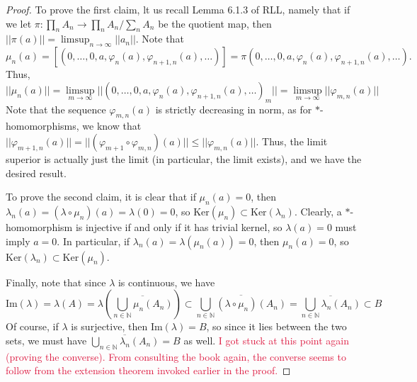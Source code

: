 \documentclass[aps,pra,showpacs,notitlepage,onecolumn,superscriptaddress,nofootinbib]{revtex4-1}
\newcommand{\pop}[1]{\textcolor{crimson}{#1}}
\theoremstyle{definition}
\begin{document}
\begin{proof}
  To prove the first claim, lt us recall Lemma 6.1.3 of RLL, namely that if we let $\pi : \prod_{n} A_n \rightarrow \prod_{n} A_n \Big/ \sum_{n} A_n$ be the quotient map, then $||\pi(a)|| = \limsup_{n \to \infty} ||a_n||$.
  Note that
  $$\mu_n(a) = [(0, \dots, 0, a, \varphi_n(a), \varphi_{n + 1, n}(a), \dots)] = \pi(0, \dots, 0, a, \varphi_n(a), \varphi_{n + 1, n}(a), \dots).$$
  Thus,
  \begin{equation}
    ||\mu_n(a)|| = \limsup_{m \to \infty} || (0, \dots, 0, a, \varphi_n(a), \varphi_{n + 1, n}(a), \dots)_m || = \limsup_{m \to \infty} ||\varphi_{m, n}(a)||
  \end{equation}
  Note that the sequence $\varphi_{m, n}(a)$ is strictly decreasing in norm, as for $*$-homomorphisms, we know that $||\varphi_{m + 1, n}(a)|| = ||(\varphi_{m + 1} \circ \varphi_{m, n})(a)|| \leq ||\varphi_{m, n}(a)||$.
  Thus, the limit superior is actually just the limit (in particular, the limit exists), and we have the desired result.
  \newline

  \noindent To prove the second claim, it is clear that if $\mu_n(a) = 0$, then $\lambda_n(a) = (\lambda \circ \mu_n)(a) = \lambda(0) = 0$, so $\text{Ker}(\mu_n) \subset \text{Ker}(\lambda_n)$.
  Clearly, a $*$-homomorphism is injective if and only if it has trivial kernel, so $\lambda(a) = 0$ must imply $a = 0$. In particular, if $\lambda_n(a) = \lambda(\mu_n(a)) = 0$, then $\mu_n(a) = 0$,
  so $\text{Ker}(\lambda_n) \subset \text{Ker}(\mu_n)$.
  \newline

  \noindent Finally, note that since $\lambda$ is continuous, we have
  \begin{equation}
    \text{Im}(\lambda) = \lambda(A) = \lambda \left( \overline{\displaystyle\bigcup_{n \in \mathbb{N}} \mu_n(A_n)} \right) \subset \overline{\displaystyle\bigcup_{n \in \mathbb{N}} (\lambda \circ \mu_n)(A_n)} = \overline{\displaystyle\bigcup_{n \in \mathbb{N}} \lambda_n(A_n)} \subset B
  \end{equation}
  Of course, if $\lambda$ is surjective, then $\text{Im}(\lambda) = B$, so since it lies between the two sets, we must have $\overline{\bigcup_{n \in \mathbb{N}} \lambda_n(A_n)} = B$ as well. \pop{I got stuck at this point again (proving the converse). From consulting the book again,
    the converse seems to follow from the extension theorem invoked earlier in the proof.}
  \end{proof}
\end{document}

